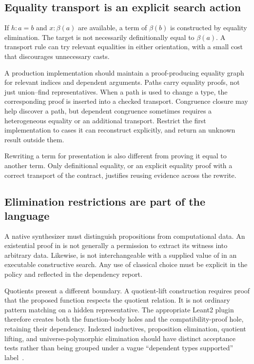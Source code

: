 \subsection{Equality transport is an explicit search action}
If $h:a=b$ and $x:\beta(a)$ are available, a term of $\beta(b)$ is constructed by equality elimination. The target is not necessarily definitionally equal to $\beta(a)$. A transport rule can try relevant equalities in either orientation, with a small cost that discourages unnecessary casts.

A production implementation should maintain a proof-producing equality graph for relevant indices and dependent arguments. Paths carry equality proofs, not just union--find representatives. When a path is used to change a type, the corresponding proof is inserted into a checked transport. Congruence closure may help discover a path, but dependent congruence sometimes requires a heterogeneous equality or an additional transport. Restrict the first implementation to cases it can reconstruct explicitly, and return an unknown result outside them.

Rewriting a term for presentation is also different from proving it equal to another term. Only definitional equality, or an explicit equality proof with a correct transport of the contract, justifies reusing evidence across the rewrite.

\subsection{Elimination restrictions are part of the language}
A native synthesizer must distinguish propositions from computational data. An existential proof in  is not generally a permission to extract its witness into arbitrary data. Likewise,  is not interchangeable with a supplied value of  in an executable constructive search. Any use of classical choice must be explicit in the policy and reflected in the dependency report.

Quotients present a different boundary. A quotient-lift construction requires proof that the proposed function respects the quotient relation. It is not ordinary pattern matching on a hidden representative. The appropriate Leant2 plugin therefore creates both the function-body holes and the compatibility-proof hole, retaining their dependency. Indexed inductives, proposition elimination, quotient lifting, and universe-polymorphic elimination should have distinct acceptance tests rather than being grouped under a vague ``dependent types supported'' label~\cite{typesystem}.

